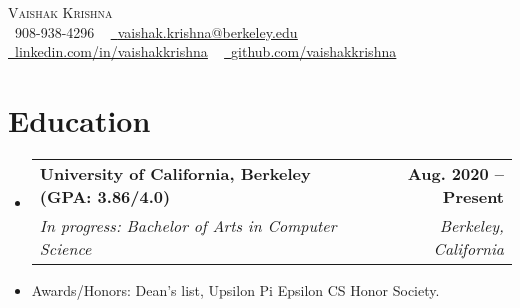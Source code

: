 \documentclass[letterpaper,11pt]{article}
\makeatletter
\newcommand{\resumeSubheading}[4]{
  \vspace{-2pt}\item
    \begin{tabular*}{1.0\textwidth}[t]{l@{\extracolsep{\fill}}r}
      \textbf{#1} & \textbf{\small #2} \\
      \textit{\small#3} & \textit{\small #4} \\
    \end{tabular*}\vspace{-7pt}
}
\newcommand{\resumeSubHeadingListStart}{\begin{itemize}[leftmargin=0.0in, label={}]}
\newcommand{\resumeSubHeadingListEnd}{\end{itemize}}
\makeatother
\begin{document}

\begin{center}
    {\Huge \scshape Vaishak Krishna} \\ \vspace{1pt}
    \small \raisebox{-0.1\height}\faPhone\ 908-938-4296 ~ \href{mailto:vaishak.krishna@berkeley.edu}{\raisebox{-0.2\height}\faEnvelope\  \underline{vaishak.krishna@berkeley.edu}} ~ 
    \href{https://linkedin.com/in/vaishakkrishna/}{\raisebox{-0.2\height}\faLinkedin\ \underline{linkedin.com/in/vaishakkrishna}}  ~
    \href{https://github.com/vaishakkrishna}{\raisebox{-0.2\height}\faGithub\ \underline{github.com/vaishakkrishna}}
    \vspace{-8pt}
\end{center}


\section{Education}
  \resumeSubHeadingListStart
    \resumeSubheading
  {University of California, Berkeley (GPA: 3.86/4.0)}{Aug. 2020 -- Present}
      {In progress: Bachelor of Arts in Computer Science}{Berkeley, California}
    \vspace{-5pt}
      \item{Awards/Honors: Dean's list, Upsilon Pi Epsilon CS Honor Society.}

  \resumeSubHeadingListEnd   
  
\vspace{-16pt}
\end{document}
